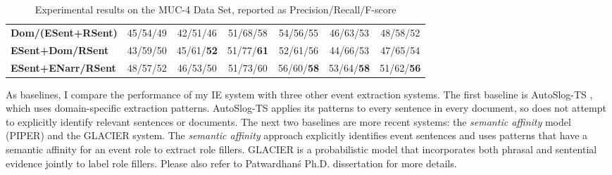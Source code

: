 \begin{table}[ht]
\begin{tabular}[center]{|p{1.4in}|ccccc|c|}
{\bf Dom/(ESent+RSent)} & 45/54/49 & 42/51/46 &

51/68/58 & 54/56/55 & 46/63/53  & 48/58/52 \\

{\bf ESent+Dom/RSent} & 43/59/50 & 45/61/{\bf 52} & 51/77/{\bf 61} & 52/61/56 & 44/66/53  & 47/65/54 \\


{\bf ESent+ENarr/RSent} & 48/57/52 & 46/53/50 & 51/73/60 & 56/60/{\bf 58} & 53/64/{\bf 58} & 51/62/{\bf 56} \\ \hline





\end{tabular}

\caption{Experimental results on the MUC-4 Data Set, reported as Precision/Recall/F-score}

\label{results-table}

\end{table}


As baselines, I compare the performance of my IE system with three
other event extraction systems.  The first baseline is AutoSlog-TS
\cite{riloff-aaai96}, which uses domain-specific extraction patterns.
AutoSlog-TS applies its patterns to every sentence in every document,
so does not attempt to explicitly identify relevant sentences or
documents.  The next two baselines are more recent systems: the
\cite{patwardhan-emnlp07} {\it semantic affinity} model (PIPER) and the
\cite{patwardhan-emnlp09} GLACIER system.  The {\it semantic affinity}
approach explicitly identifies event sentences and uses patterns that
have a semantic affinity for an event role to extract role
fillers. GLACIER is a probabilistic model that incorporates both
phrasal and sentential evidence jointly to label role fillers. 
Please also refer to Patwardhan\'s Ph.D. dissertation 
\cite{Patwardhan10} for more details.




